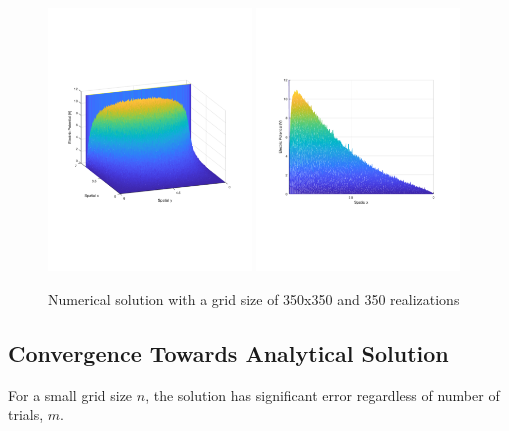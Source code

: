 \documentclass{amsart}
\begin{document}
\begin{figure}[H]
	\caption{Numerical solution with a grid size of 350x350 and 350 realizations}
	\label{finalsolution}
	\includegraphics[width=0.48\textwidth]{solution_Dec11_9hrs_isoview.pdf}
	\includegraphics[width=0.48\textwidth]{solution_Dec11_9hrs_sideview.pdf}
\end{figure}

\subsection{Convergence Towards Analytical Solution}

For a small grid size $n$, the solution has significant error regardless of number of trials, $m$.
\end{document}
